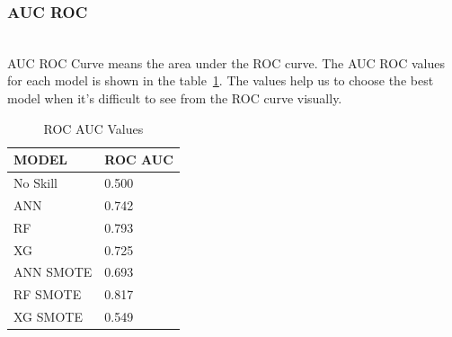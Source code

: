 
\subsubsection{AUC ROC}\hspace*{\fill} \\
AUC ROC Curve means the area under the ROC curve. The AUC ROC values for each model is shown in the table~\ref{tab: roc_auc}. The values help us to choose the best model when it's difficult to see from the ROC curve visually. 
\begin{table}[H]
    \begin{tabular}{|l|l|}
    \hline
    MODEL     & ROC AUC \\ \hline
    No Skill  & 0.500   \\ \hline
    ANN       & 0.742   \\ \hline
    RF        & 0.793   \\ \hline
    XG        & 0.725   \\ \hline
    ANN SMOTE & 0.693   \\ \hline
    RF SMOTE  & 0.817   \\ \hline
    XG SMOTE  & 0.549   \\ \hline
    \end{tabular}
    \caption{ROC AUC Values}
    \label{tab: roc_auc}
\end{table}


